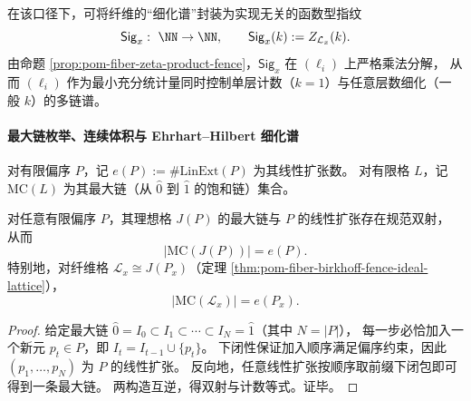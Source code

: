 \begin{remark}[函数型谱指纹]\label{rem:pom-fence-sig-function}
在该口径下，可将纤维的“细化谱”封装为实现无关的函数型指纹
\[
\mathsf{Sig}_x:\ \NN\to\NN,\qquad
\mathsf{Sig}_x(k):=Z_{\mathcal L_x}(k).
\]
由命题 \ref{prop:pom-fiber-zeta-product-fence}，\(\mathsf{Sig}_x\) 在 \((\ell_i)\) 上严格乘法分解，
从而 \((\ell_i)\) 作为最小充分统计量同时控制单层计数（\(k=1\)）与任意层数细化（一般 \(k\)）的多链谱。
\end{remark}

\paragraph{最大链枚举、连续体积与 Ehrhart--Hilbert 细化谱}

\begin{definition}[线性扩张数与最大链数]\label{def:pom-fence-linext-maxchain}
对有限偏序 \(P\)，记 \(e(P):=\#\mathrm{LinExt}(P)\) 为其线性扩张数。
对有限格 \(L\)，记 \(\mathrm{MC}(L)\) 为其最大链（从 \(\hat0\) 到 \(\hat1\) 的饱和链）集合。
\end{definition}

\begin{theorem}\label{thm:pom-maxchains-equals-linext}
对任意有限偏序 \(P\)，其理想格 \(J(P)\) 的最大链与 \(P\) 的线性扩张存在规范双射，
从而
\[
|\mathrm{MC}(J(P))|=e(P).
\]
特别地，对纤维格 \(\mathcal L_x\cong J(P_x)\)（定理 \ref{thm:pom-fiber-birkhoff-fence-ideal-lattice}），
\[
|\mathrm{MC}(\mathcal L_x)|=e(P_x).
\]
\end{theorem}
\begin{proof}
给定最大链 \(\hat0=I_0\subset I_1\subset\cdots\subset I_N=\hat1\)（其中 \(N=|P|\)），
每一步必恰加入一个新元 \(p_t\in P\)，即 \(I_t=I_{t-1}\cup\{p_t\}\)。
下闭性保证加入顺序满足偏序约束，因此 \((p_1,\dots,p_N)\) 为 \(P\) 的线性扩张。
反向地，任意线性扩张按顺序取前缀下闭包即可得到一条最大链。
两构造互逆，得双射与计数等式。证毕。
\end{proof}


